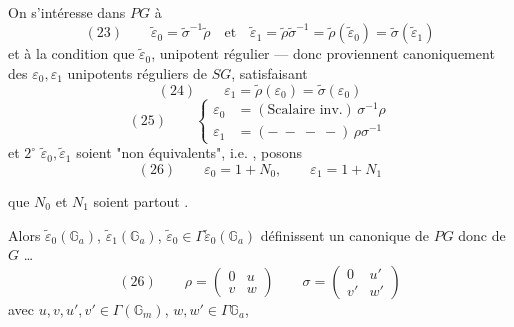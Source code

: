 On s'intéresse dans $PG$ à
\[
(23)\qquad
\widetilde\varepsilon_0
=\widetilde\sigma^{-1}\widetilde\rho
\quad\text{et}\quad
\widetilde\varepsilon_1
=\widetilde\rho\widetilde\sigma^{-1}
=\widetilde\rho(\widetilde\varepsilon_0)
=\widetilde\sigma(\widetilde\varepsilon_1)
\]
et à la condition que
$\widetilde\varepsilon_0$,
 unipotent régulier —
donc 
proviennent canoniquement des
$\varepsilon_0,\varepsilon_1$ unipotents réguliers de $SG$,
satisfaisant
\[
(24)\qquad
\varepsilon_1=\widetilde\rho(\varepsilon_0)
=\widetilde\sigma(\varepsilon_0)
\]
\[
(25)\qquad
\left\{
\begin{aligned}
\varepsilon_0&=(\text{Scalaire inv.})\,\sigma^{-1}\rho\\
\varepsilon_1&=(-\ -\ -\ -)\,\rho\sigma^{-1}
\end{aligned}
\right.
\]
et \textcircled{\(2^\circ\)}
$\widetilde\varepsilon_0,\widetilde\varepsilon_1$ soient
"non équivalents",
i.e. , posons
\[
(26)\qquad
\varepsilon_0=1+N_0,\qquad
\varepsilon_1=1+N_1
\]



que $N_0$ et $N_1$ soient partout
.

Alors $\widetilde\varepsilon_0(\mathbb G_a)$,
$\widetilde\varepsilon_1(\mathbb G_a)$,
$\widetilde\varepsilon_0\in\Gamma
\widetilde\varepsilon_0(\mathbb G_a)$ définissent
un 
 canonique de $PG$ donc de $G$ \ldots
{}
\[
(26)\qquad
\rho=\begin{pmatrix}0&u\\v&w\end{pmatrix}
\qquad
\sigma=\begin{pmatrix}0&u'\\v'&w'\end{pmatrix}
\]
avec $u,v,u',v'\in\Gamma(\mathbb G_m)$,
$w,w'\in\Gamma\mathbb G_a$,
\deleted{$\unsure{\rho}$}

